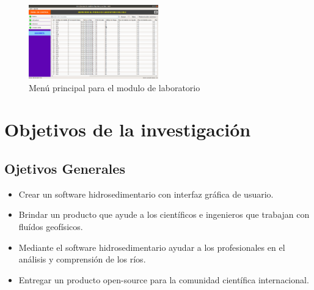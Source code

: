 \documentclass[12pt,a4paper]{report}
\begin{document}
\begin{figure}[h]
  \centering
    \includegraphics[width=0.5\textwidth]{Captura_de_pantalla/imagen_modulo_laboratorio_N01}
  \caption{Menú principal para el modulo de laboratorio}
  \label{fig:ventana_inicial_de_qt_designer}
\end{figure}



\section{Objetivos de la investigación}
	\subsection{Ojetivos Generales}
	\begin{itemize}
	\item Crear un software hidrosedimentario con interfaz gráfica de usuario.
	\item Brindar un producto que ayude a los científicos e ingenieros que trabajan con fluídos geofísicos.
	\item Mediante el software hidrosedimentario ayudar a los profesionales en el análisis y comprensión de los ríos.
	\item Entregar un producto open-source para la comunidad científica internacional.
	\end{itemize}
\end{document}
